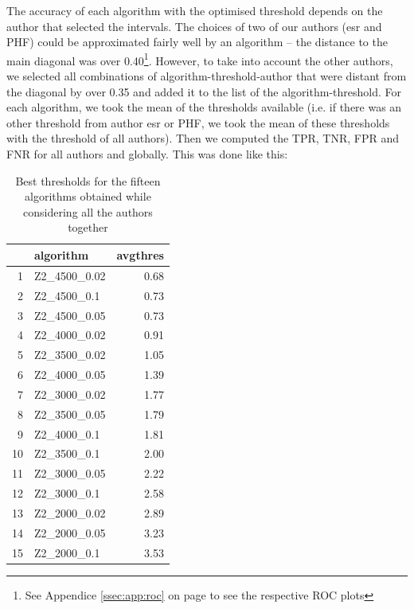 \documentclass{article}\usepackage[]{graphicx}\usepackage[]{color}
\begin{document}
The accuracy of each algorithm with the optimised threshold depends on the author that selected the intervals. The choices of two of our authors (esr and PHF) could be approximated fairly well by an algorithm -- the distance to the main diagonal was over 0.40\footnote{See Appendice \ref{ssec:app:roc} on page \pageref{ssec:app:roc} to see the respective ROC plots}. However, to take into account the other authors, we selected all combinations of algorithm-threshold-author that were distant from the diagonal by over 0.35 and added it to the list of the algorithm-threshold. For each algorithm, we took the mean of the thresholds available (i.e. if there was an other threshold from author esr or PHF, we took the mean of these thresholds with the threshold of all authors). Then we computed the TPR, TNR, FPR and FNR for all authors and globally. This was done like this:
\begin{table}[ht]
\centering
\begin{tabular}{rlr}
  \hline
 & algorithm & avgthres \\ 
  \hline
1 & Z2\_4500\_0.02 & 0.68 \\ 
  2 & Z2\_4500\_0.1 & 0.73 \\ 
  3 & Z2\_4500\_0.05 & 0.73 \\ 
  4 & Z2\_4000\_0.02 & 0.91 \\ 
  5 & Z2\_3500\_0.02 & 1.05 \\ 
  6 & Z2\_4000\_0.05 & 1.39 \\ 
  7 & Z2\_3000\_0.02 & 1.77 \\ 
  8 & Z2\_3500\_0.05 & 1.79 \\ 
  9 & Z2\_4000\_0.1 & 1.81 \\ 
  10 & Z2\_3500\_0.1 & 2.00 \\ 
  11 & Z2\_3000\_0.05 & 2.22 \\ 
  12 & Z2\_3000\_0.1 & 2.58 \\ 
  13 & Z2\_2000\_0.02 & 2.89 \\ 
  14 & Z2\_2000\_0.05 & 3.23 \\ 
  15 & Z2\_2000\_0.1 & 3.53 \\ 
   \hline
\end{tabular}
\caption{Best thresholds for the fifteen algorithms obtained while considering all the authors together} 
\label{tab:comp}
\end{table}
\end{document}

